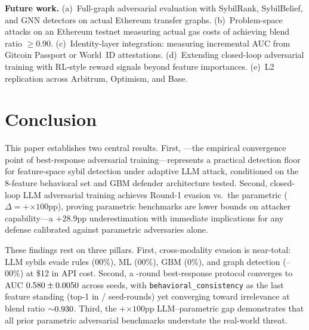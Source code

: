 \documentclass[sigconf,nonacm=false]{acmart}
\begin{document}
\noindent\textbf{Future work.}
(a)~Full-graph adversarial evaluation with SybilRank, SybilBelief, and GNN detectors on actual Ethereum transfer graphs.
(b)~Problem-space attacks on an Ethereum testnet measuring actual gas costs of achieving blend ratio $\ge$0.90.
(c)~Identity-layer integration: measuring incremental AUC from Gitcoin Passport or World~ID attestations.
(d)~Extending closed-loop adversarial training with RL-style reward signals beyond feature importances.
(e)~L2 replication across Arbitrum, Optimism, and Base.


\section{Conclusion}
\label{sec:conclusion}

This paper establishes two central results. First, \textbf{\bestResponseAucFloorMean{}}---the empirical convergence point of best-response adversarial training---represents a practical detection floor for feature-space sybil detection under adaptive LLM attack, conditioned on the 8-feature behavioral set and GBM defender architecture tested. Second, closed-loop LLM adversarial training achieves Round-1 evasion \closedLoopRoundLlmEvasionMean{} vs.\ the parametric \closedLoopRoundParametricEvasionMean{} ($\Delta{=}+$\closedLoopRoundEvasionDelta{}$\times 100$pp), proving parametric benchmarks are lower bounds on attacker capability---a $+$28.9pp underestimation with immediate implications for any defense calibrated against parametric adversaries alone.

These findings rest on three pillars. First, cross-modality evasion is near-total: LLM sybils evade rules (\evasionThresholdRules{}00\%), ML (\evasionThresholdRules{}00\%), GBM (\evasionLightgbmMl{}0\%), and graph detection (\evasionGraphModerate{}--\evasionGraphAdvanced{}00\%) at \$12 in API cost. Second, a \bestResponseNRounds{}-round best-response protocol converges to AUC $0.580{} \pm 0.0050{}$ across \bestResponseNSeeds{} seeds, with \texttt{behavioral\_consistency} as the last feature standing (top-1 in \behavioralConsistencyTopInNRounds{}/\behavioralConsistencyTopTotalRounds{} seed-rounds) yet converging toward irrelevance at blend ratio ${\sim}0.930{}$. Third, the $+$\closedLoopRoundEvasionDelta{}$\times 100$pp LLM--parametric gap demonstrates that all prior parametric adversarial benchmarks understate the real-world threat.
\end{document}
